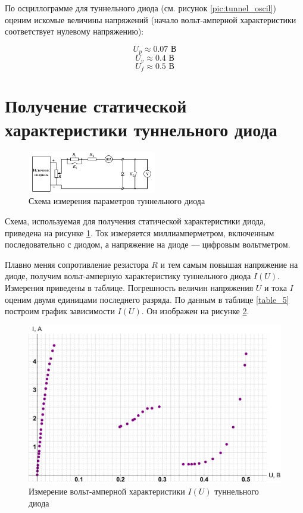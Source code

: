 \documentclass[12pt]{kiarticle} %
\begin{document}
	
	
	По осциллограмме для туннельного диода (см. рисунок \ref{pic:tunnel_oscil}) оценим искомые величины напряжений (начало вольт-амперной характеристики соответствует нулевому напряжению): 
	
	\[ U_p \approx 0.07 \text{ В} \]
	\[ U_v \approx 0.4  \text{ В} \]
	\[ U_f \approx 0.5  \text{ В} \]
%	
%	
	
	
	\section{Получение статической характеристики туннельного диода}
	
		\begin{figure}[h]
		\centering	
		\includegraphics[width=0.5\textwidth]{scheme.png}
		\caption{Схема измерения параметров туннельного диода}
		\label{pic:scheme}
	\end{figure}
	
	Схема, используемая для получения статической характеристики диода, приведена на рисунке \ref{pic:scheme}. Ток измеряется миллиамперметром, включенным последовательно с диодом, а напряжение на диоде --- цифровым вольтметром. 
	
	Плавно меняя сопротивление резистора $ R $ и тем самым повышая напряжение на диоде, получим вольт-амперную характеристику туннельного диода $I(U)$.  Измерения приведены в таблице. Погрешность величин напряжения $U$ и тока $I$ оценим двумя единицами последнего разряда. По данным в таблице \ref{table_5} построим график зависимости $I(U)$. Он изображен на рисунке \ref{graf}. 
	
	\begin{figure}[h]
		\includegraphics[scale=0.47]{graf.pdf}
		\caption{Измерение вольт-амперной характеристики $I(U)$ туннельного диода}
		\label{graf}
	\end{figure}
	
\end{document}
